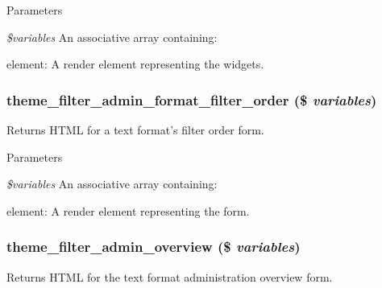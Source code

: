 \begin{DoxyParams}{Parameters}
\item[{\em \$variables}]An associative array containing:
\begin{DoxyItemize}
\item element: A render element representing the widgets. 
\end{DoxyItemize}\end{DoxyParams}
\hypertarget{group__themeable_ga4abf76fee40295b66872dfa398ab1319}{
\subsubsection[{theme\_\-filter\_\-admin\_\-format\_\-filter\_\-order}]{\setlength{\rightskip}{0pt plus 5cm}theme\_\-filter\_\-admin\_\-format\_\-filter\_\-order (\$ {\em variables})}}
\label{group__themeable_ga4abf76fee40295b66872dfa398ab1319}
Returns HTML for a text format's filter order form.


\begin{DoxyParams}{Parameters}
\item[{\em \$variables}]An associative array containing:
\begin{DoxyItemize}
\item element: A render element representing the form. 
\end{DoxyItemize}\end{DoxyParams}
\hypertarget{group__themeable_ga8616d9e341ab5e1466cbbf8111c172d2}{
\subsubsection[{theme\_\-filter\_\-admin\_\-overview}]{\setlength{\rightskip}{0pt plus 5cm}theme\_\-filter\_\-admin\_\-overview (\$ {\em variables})}}
\label{group__themeable_ga8616d9e341ab5e1466cbbf8111c172d2}
Returns HTML for the text format administration overview form.


